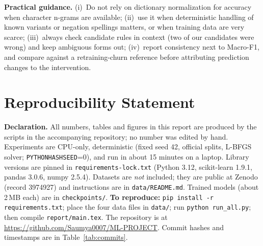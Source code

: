 \documentclass[10pt,twocolumn,letterpaper]{article}
\newcommand{\RepoURL}{https://github.com/Saumya0007/ML-PROJECT}
\begin{document}
\textbf{Practical guidance.} (i)~Do not rely on dictionary normalization for accuracy when character n-grams are available; (ii)~use it when deterministic handling of known variants or negation spellings matters, or when training data are very scarce; (iii)~always check candidate rules in context (two of our candidates were wrong) and keep ambiguous forms out; (iv)~report consistency next to Macro-F1, and compare against a retraining-churn reference before attributing prediction changes to the intervention.

\section*{Reproducibility Statement}
\textbf{Declaration.} All numbers, tables and figures in this report are produced by the scripts in the accompanying repository; no number was edited by hand. Experiments are CPU-only, deterministic (fixed seed 42, official splits, L-BFGS solver; \texttt{PYTHONHASHSEED}=0), and run in about 15 minutes on a laptop. Library versions are pinned in \texttt{requirements-lock.txt} (Python 3.12, scikit-learn 1.9.1, pandas 3.0.6, numpy 2.5.4). Datasets are \emph{not} included; they are public at Zenodo (record 3974927) and instructions are in \texttt{data/README.md}. Trained models (about 2\,MB each) are in \texttt{checkpoints/}. \textbf{To reproduce:} \texttt{pip install -r requirements.txt}; place the four data files in \texttt{data/}; run \texttt{python run\_all.py}; then compile \texttt{report/main.tex}. The repository is at \url{\RepoURL}. Commit hashes and timestamps are in Table~\ref{tab:commits}.

{\small}

\appendix
\end{document}
